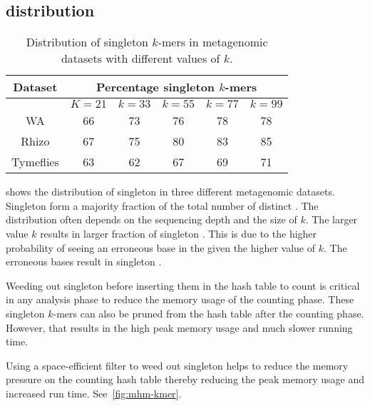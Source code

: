 
\subsection{\Kmer distribution}

\begin{wraptable}{r}{4.5in}
\centering
    \begin{tabular}{c | c | c | c | c | c}
    \toprule
    {\bf Dataset} & \multicolumn{5}{c}{\bf Percentage singleton $k$-mers} \\
    \midrule
    & $K=21$ & $k=33$ & $k=55$ & $k=77$ & $k=99$ \\
    \midrule
    WA &  66 & 73 & 76 & 78 & 78  \\
    Rhizo &  67 & 75 & 80 & 83 & 85  \\
    Tymeflies & 63 & 62 & 67 & 69 & 71 \\
    \bottomrule
    \end{tabular}
    \caption{Distribution of singleton $k$-mers in metagenomic datasets with different values of $k$.}
    \label{tab:kmer-dist}
\end{wraptable}

 shows the distribution of singleton \kmers in three
different metagenomic datasets. Singleton \kmers form a majority fraction of
the total number of distinct \kmers. The distribution often depends on the
sequencing depth and the size of $k$. The larger value $k$ results in larger
fraction of singleton \kmers. This is due to the higher probability of seeing
an erroneous base in the \kmer given the higher value of $k$. The erroneous
bases result in singleton \kmers.

Weeding out singleton \kmers before inserting them in the hash table to count
is critical in any \kmer analysis phase to reduce the memory usage of the
counting phase. These singleton $k$-mers can also be pruned from the hash table
after the counting phase. However, that results in the high peak memory usage
and much slower running time.

Using a space-efficient filter to weed out singleton \kmers helps to reduce
the memory pressure on the counting hash table thereby reducing the peak memory
usage and increased run time. See~\cref{fig:mhm-kmer}.


